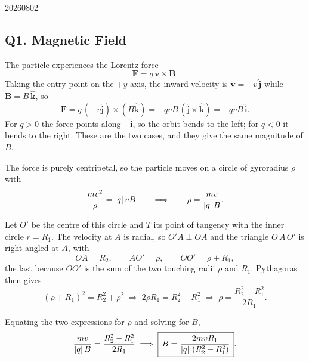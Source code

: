 \begin{solution}{20260802}
\begin{center}

\end{center}

\subsection*{Q1. Magnetic Field}

The particle experiences the Lorentz force
\[
  \mathbf{F} = q\,\mathbf{v}\times\mathbf{B}.
\]
Taking the entry point on the $+y$-axis, the inward velocity is $\mathbf{v} = -v\,\hat{\mathbf{j}}$ while $\mathbf{B} = B\,\hat{\mathbf{k}}$, so
\[
  \mathbf{F} = q\,(-v\hat{\mathbf{j}})\times(B\hat{\mathbf{k}})
            = -qvB\,(\hat{\mathbf{j}}\times\hat{\mathbf{k}})
            = -qvB\,\hat{\mathbf{i}}.
\]
For $q>0$ the force points along $-\hat{\mathbf{i}}$, so the orbit bends to the left; for $q<0$ it bends to the right.  These are the two cases, and they give the same magnitude of $B$.

The force is purely centripetal, so the particle moves on a circle of gyroradius $\rho$ with
\[
  \frac{mv^2}{\rho} = \left\lvert q \right\rvert vB
  \qquad\Longrightarrow\qquad
  \rho = \frac{mv}{\left\lvert q \right\rvert B}.
\]

Let $O'$ be the centre of this circle and $T$ its point of tangency with the inner circle $r = R_1$.  The velocity at $A$ is radial, so $O'A \perp OA$ and the triangle $O\,A\,O'$ is right-angled at $A$, with
\[
  OA = R_2, \qquad AO' = \rho, \qquad OO' = \rho + R_1,
\]
the last because $OO'$ is the sum of the two touching radii $\rho$ and $R_1$.  Pythagoras then gives
\[
  (\rho + R_1)^2 = R_2^2 + \rho^2
  \;\Longrightarrow\;
  2\rho R_1 = R_2^2 - R_1^2
  \;\Longrightarrow\;
  \rho = \frac{R_2^2 - R_1^2}{2R_1}.
\]

Equating the two expressions for $\rho$ and solving for $B$,
\[
  \frac{mv}{\left\lvert q \right\rvert B} = \frac{R_2^2 - R_1^2}{2R_1}
  \;\Longrightarrow\;
  \boxed{\,B = \frac{2mvR_1}{\left\lvert q \right\rvert\,(R_2^2 - R_1^2)}\,}.
\]

\end{solution}


